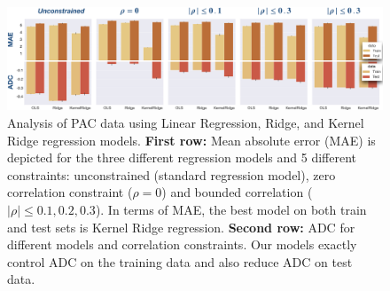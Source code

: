 \documentclass[utf8]{frontiersSCNS} %
\begin{document}
\begin{figure}[h!]
\begin{center}
\includegraphics[width=1.\textwidth]{figures/Fig_PAC_Results.jpeg}
\end{center}
\caption{Analysis of PAC data using Linear Regression, Ridge, and Kernel Ridge regression models. \textbf{First row:} Mean absolute error (MAE) is depicted for the three different regression models and 5 different constraints: unconstrained (standard regression model), zero correlation constraint ($\rho=0$) and bounded correlation ($|\rho|\le0.1, 0.2, 0.3$). In terms of MAE, the best model on both train and test sets is Kernel Ridge regression.
\textbf{Second row:} ADC for different models and correlation constraints. Our models exactly control ADC on the training data and also reduce ADC on test data.}\label{fig:pac_results}
\end{figure}
\end{document}
